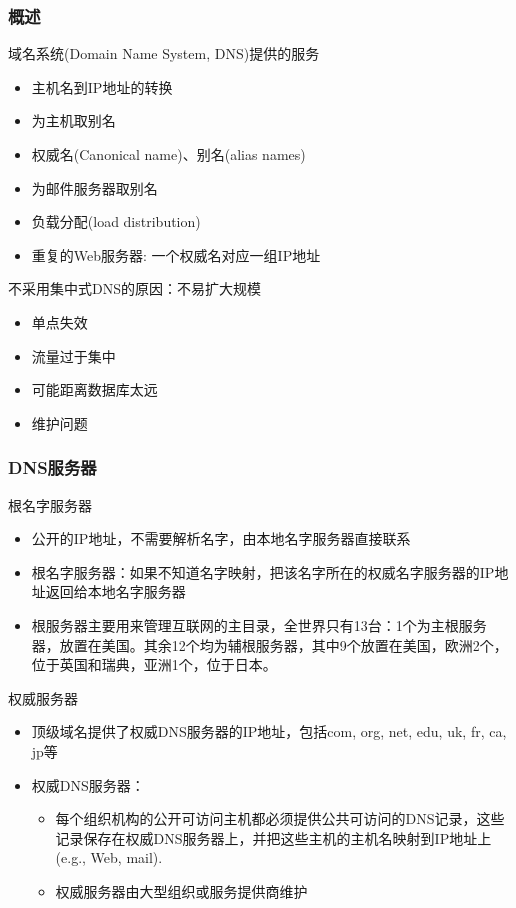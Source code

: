 \subsubsection{概述}
域名系统(Domain Name System, DNS)提供的服务
\begin{itemize}
\item 主机名到IP地址的转换
\item 为主机取别名
\item 权威名(Canonical name)、别名(alias names)
\item 为邮件服务器取别名
\item  负载分配(load distribution)
\item 重复的Web服务器: 一个权威名对应一组IP地址
\end{itemize}

\myhline
不采用集中式DNS的原因：不易扩大规模
\begin{itemize}
\item 单点失效
\item 流量过于集中
\item 可能距离数据库太远
\item 维护问题
\end{itemize}

\subsubsection{DNS服务器}
根名字服务器
\begin{itemize}
\item 公开的IP地址，不需要解析名字，由本地名字服务器直接联系
\item 根名字服务器：如果不知道名字映射，把该名字所在的权威名字服务器的IP地址返回给本地名字服务器
\item 根服务器主要用来管理互联网的主目录，全世界只有13台：1个为主根服务器，放置在美国。其余12个均为辅根服务器，其中9个放置在美国，欧洲2个，位于英国和瑞典，亚洲1个，位于日本。
\end{itemize}

权威服务器
\begin{itemize}
\item 顶级域名提供了权威DNS服务器的IP地址，包括com, org, net, edu, uk, fr, ca, jp等
\item 权威DNS服务器：
\begin{itemize}
\item 每个组织机构的公开可访问主机都必须提供公共可访问的DNS记录，这些记录保存在权威DNS服务器上，并把这些主机的主机名映射到IP地址上(e.g., Web, mail).
\item 权威服务器由大型组织或服务提供商维护
\end{itemize}
\end{itemize}

